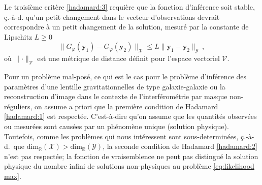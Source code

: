 Le troisième critère \ref{hadamard:3} requière que la fonction d'inférence soit stable, ç.-à-d. qu'un petit changement 
dans le vecteur d'observations devrait correspondre à un petit changement de la solution, mesuré par la constante de Lipschitz
$L \geq 0$
\begin{equation}\label{eq:Lipschitz}
        \lVert G_\varphi(\mathbf{y}_1) - G_\varphi(\mathbf{y}_2)\rVert_{\mathcal{X}} \leq L \lVert \mathbf{y}_1 - \mathbf{y}_2\rVert_{\mathcal{Y}}\, ,
\end{equation}
où $\lVert \cdot \rVert_{\mathcal{V}}$ est une métrique de distance définit pour l'espace vectoriel $\mathcal{V}$.


Pour un problème mal-posé, ce qui est le cas pour le problème d'inférence des paramètres d'une lentille 
gravitationnelles de type galaxie-galaxie ou la reconstruction d'image dans le contexte de l'interférométrie  
par masque non-réguliers, 
on assume a priori que la première condition de Hadamard \ref{hadamard:1} est respectée. C'est-à-dire qu'on assume 
que les quantités observées ou mesurées sont causées par un phénomène unique (solution physique). 
Toutefois, comme les problèmes qui nous intéressent sont sous-determinées, 
ç.-à-d.\ que $\mathrm{dim}_{\mathbb{R}}(\mathcal{X}) > \mathrm{dim}_{\mathbb{R}}(\mathcal{Y})$,
la seconde condition de Hadamard \ref{hadamard:2} n'est pas respectée; la fonction de vraisemblence 
ne peut pas distingué la solution physique du nombre infini de solutions non-physiques au problème \eqref{eq:likelihood max}.

